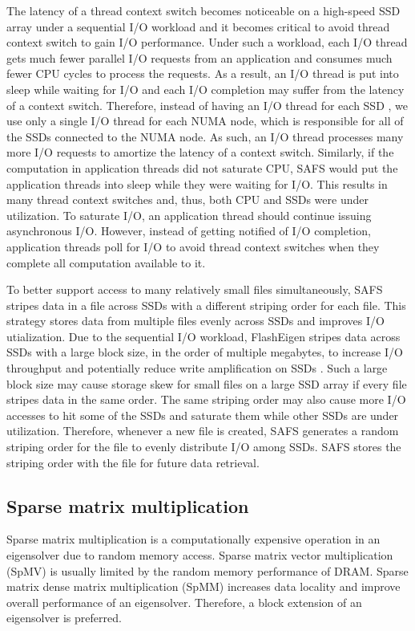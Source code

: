 The latency of a thread context switch becomes noticeable on a high-speed SSD
array under a sequential I/O workload and it becomes critical to avoid thread
context switch to gain I/O performance. Under such a workload, each I/O thread
gets much fewer parallel I/O requests from an application and consumes much
fewer CPU cycles to process the requests. As a result, an I/O thread is
put into sleep while waiting for I/O and each I/O completion may suffer from
the latency of a context switch.
Therefore, instead of having an I/O thread for each SSD \cite{safs}, we
use only a single I/O thread for each NUMA node, which is responsible for
all of the SSDs connected to the NUMA node. As such, an I/O thread processes
many more I/O requests to amortize the latency of a context switch.
Similarly, if the computation in application threads did not saturate CPU,
SAFS would put the application threads into sleep while they were waiting
for I/O. This results in many thread context switches and, thus, both CPU and
SSDs were under utilization. To saturate I/O, an application thread should
continue
issuing asynchronous I/O. However, instead of getting notified of I/O completion,
application threads poll for I/O to avoid thread context switches when they
complete all computation available to it.

To better support access to many relatively small files simultaneously, SAFS
stripes data in a file across SSDs with a different striping order for each file.
This strategy stores data from multiple files evenly across SSDs and improves
I/O utialization. Due to the sequential I/O workload, FlashEigen stripes data
across SSDs with a large block size, in the order of multiple
megabytes, to increase I/O throughput and potentially reduce write amplification
on SSDs \cite{}. Such a large block size may cause storage skew for small files
on a large SSD array if every file stripes data in the same order.
The same striping order may also cause more I/O accesses to hit some of the SSDs
and saturate them while other SSDs are under utilization. Therefore, whenever
a new file is created, SAFS generates a random striping order for the file to
evenly distribute I/O among SSDs. SAFS stores the striping order with the file
for future data retrieval.



\subsection{Sparse matrix multiplication} \label{spmm}
Sparse matrix multiplication is a computationally expensive
operation in an eigensolver due to random memory access. Sparse matrix vector
multiplication (SpMV) is usually limited by the random memory performance of
DRAM. Sparse matrix dense matrix multiplication (SpMM) increases data locality
and improve overall performance of an eigensolver. Therefore, a block extension
of an eigensolver is preferred.

